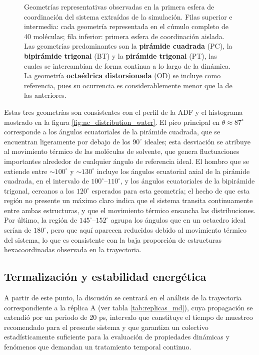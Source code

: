 \begin{figure}[htbp]
    \caption[Geometrías representativas de la primera esfera, ]{Geometrías representativas observadas en la primera esfera de
    coordinación del sistema  extraídas de la simulación. Filas
    superior e intermedia: cada geometría representada en el cúmulo completo de 40 moléculas;
    fila inferior: primera esfera de coordinación aislada. Las geometrías predominantes son la
    \textbf{pirámide cuadrada} (PC), la \textbf{bipirámide trigonal} (BT)
    y la \textbf{pirámide trigonal} (PT), las cuales se intercambian de forma
    continua a lo largo de la dinámica. La geometría \textbf{octaédrica distorsionada} (OD)
    se incluye como referencia, pues su ocurrencia es considerablemente menor que la de las
    anteriores.}
    \label{fig:geom_repr_agua}
\end{figure}

Estas tres geometrías son consistentes con el perfil de la ADF y el histograma mostrado en la figura \ref{fig:nc_distribution_water}. El pico principal en $\theta \approx 87^\circ$ corresponde a los ángulos ecuatoriales de la pirámide cuadrada, que se encuentran ligeramente por debajo de los $90^\circ$ ideales; esta desviación se atribuye al movimiento térmico de las moléculas de solvente, que genera fluctuaciones importantes alrededor de cualquier ángulo de referencia ideal. El hombro que se extiende entre $\sim\!100^\circ$ y $\sim\!130^\circ$ incluye los ángulos ecuatorial axial de la pirámide cuadrada, en el intervalo de $100^\circ$--$110^\circ$, y los ángulos ecuatoriales de la bipirámide trigonal, cercanos a los $120^\circ$ esperados para esta geometría; el hecho de que esta región no presente un máximo claro indica que el sistema transita continuamente entre ambas estructuras, y que el movimiento térmico ensancha las distribuciones. Por último, la región de $145^\circ$--$152^\circ$ agrupa los ángulos que en un octaedro ideal serían de $180^\circ$, pero que aquí aparecen reducidos debido al movimiento térmico del sistema, lo que es consistente con la baja proporción de estructuras hexacoordinadas observada en la trayectoria.

\subsection*{Termalización y estabilidad energética}

A partir de este punto, la discusión se centrará en el análisis de la trayectoria correspondiente a la réplica A (ver tabla \ref{tab:replicas_md}), cuya propagación se extendió por un periodo de 20 ps, intervalo que constituye el tiempo de muestreo recomendado para el presente sistema y que garantiza un colectivo estadísticamente suficiente para la evaluación de propiedades dinámicas
y fenómenos que demandan un tratamiento temporal continuo.

